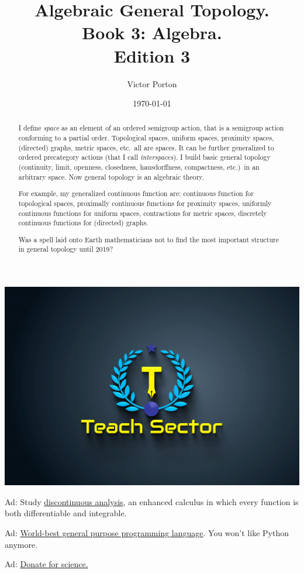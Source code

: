 \documentclass[english,reqno,12pt]{amsbook}
\begin{document}
\noindent
\href{https://teachsector.com/limit/}{\includegraphics[scale=0.3]{img/Teach-Sector.jpeg}}

\noindent
Ad: Study \href{https://teachsector.com/limit/}{discontinuous analysis}, an enhanced
calculus in which every function is both differentiable and integrable.

\noindent
Ad: \href{https://teachsector.com/dforpython/}{World-best general purpose programming language}.
You won't like Python anymore.

\noindent
Ad: \href{https://science-dao.vporton.name}{Donate for science.}

\title{Algebraic General Topology.\\Book 3: Algebra.\\Edition 3}

\author{Victor Porton}



\date{\today}

\begin{abstract}
I define \emph{space} as an element of an ordered semigroup action, that is a semigroup action conforming to a partial order. Topological spaces, uniform spaces, proximity spaces, (directed) graphs, metric spaces, etc.\ all are spaces. It can be further generalized to ordered precategory actions (that I call \emph{interspaces}). I build basic general topology (continuity, limit, openness, closedness, hausdorffness, compactness, etc.)\ in an arbitrary space. Now general topology is an algebraic theory.

For example, my generalized continuous function are: continuous function for topological spaces, proximally continuous functions for proximity spaces, uniformly continuous functions for uniform spaces, contractions for metric spaces, discretely continuous functions for (directed) graphs.

Was a spell laid onto Earth mathematicians not to find the most important structure in general topology until 2019?
\end{abstract}
\end{document}
